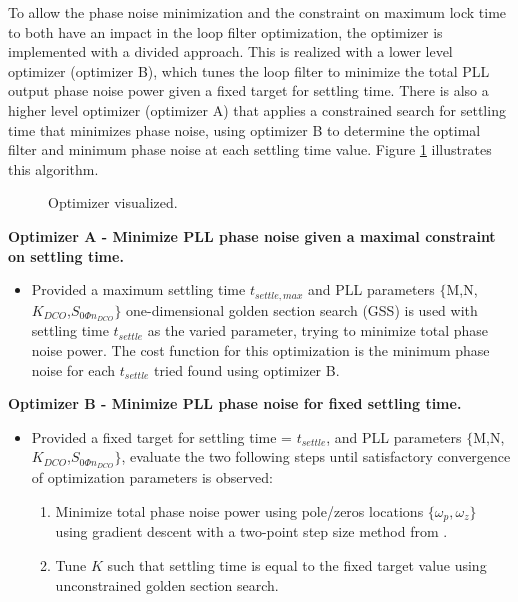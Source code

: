 To allow the phase noise minimization and the constraint on maximum lock time to both have an impact in the loop filter optimization, the optimizer is implemented with a divided approach. This is realized with a lower level optimizer (optimizer B), which tunes the loop filter to minimize the total PLL output phase noise power given a fixed target for settling time. There is also a higher level optimizer (optimizer A) that applies a constrained search for settling time that minimizes phase noise, using optimizer B to determine the optimal filter and minimum phase noise at each settling time value. Figure \ref{fig:optimizer} illustrates this algorithm.

\begin{figure}[htb!]
	\center
	\caption{Optimizer visualized.}
	\label{fig:optimizer}
\end{figure}

\textbf{Optimizer A - Minimize PLL phase noise given a maximal constraint on settling time.}
\begin{itemize}
	\setlength\itemsep{-0.8em}
	\item Provided a maximum settling time $t_{settle,max}$ and PLL parameters $\{\mathrm{M}$,$\mathrm{N}$,$K_{DCO}$,$S_{0\Phi n_{DCO}}\}$ one-dimensional golden section search (GSS) \cite{press_2007} is used with settling time $t_{settle}$ as the varied parameter, trying to minimize total phase noise power. The cost function for this optimization is the minimum phase noise for each $t_{settle}$ tried found using optimizer B. 
\end{itemize} 
\textbf{Optimizer B - Minimize PLL phase noise for fixed settling time.}\label{lf_opt}
\begin{itemize}
	\setlength\itemsep{-0.8em}
	\item Provided a fixed target for settling time = $t_{settle}$, and PLL parameters $\{\mathrm{M}$,$\mathrm{N}$,$K_{DCO}$,$S_{0\Phi n_{DCO}}\}$, evaluate the two following steps until satisfactory convergence of optimization parameters is observed:
	\begin{enumerate}[itemsep=0pt,label=\protect\mycirc{\arabic*}]
		\setlength\itemsep{-0.8em}
		\item Minimize total phase noise power using pole/zeros locations $\{\omega_p, \omega_z\}$ using gradient descent with a two-point step size method from \cite{barzilai_borwein_1988}.
		\item Tune $K$ such that settling time is equal to the fixed target value using unconstrained golden section search.
	\end{enumerate}
\end{itemize}

